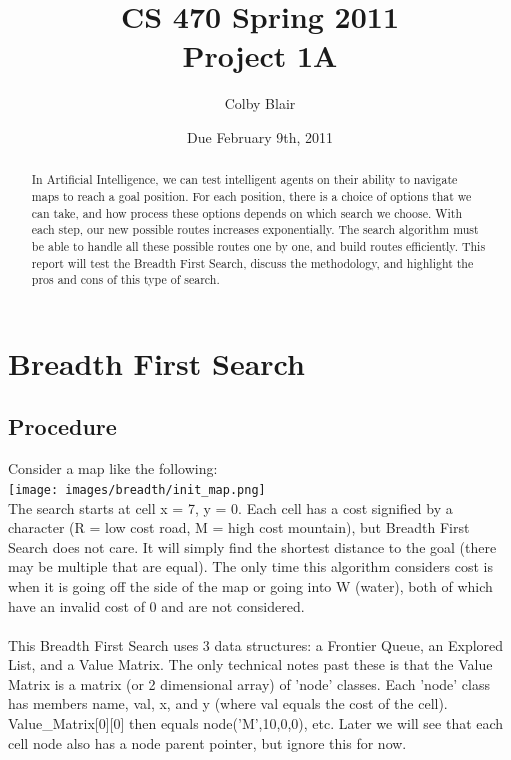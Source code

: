 \documentclass[12pt]{article}
\title{CS 470 Spring 2011 \\
     Project 1A}
\author{Colby Blair}
\date{Due February 9th, 2011}
\begin{document}
\maketitle
\begin{abstract}
In Artificial Intelligence, we can test intelligent agents on their ability to navigate maps to reach a goal position. For each position, there is a choice of options that we can take, and how process these options depends on which search we choose. With each step, our new possible routes increases exponentially. The search algorithm must be able to handle all these possible routes one by one, and build routes efficiently. This report will test the Breadth First Search, discuss the methodology, and highlight the pros and cons of this type of search.
\end{abstract}
\pagebreak
\section{Breadth First Search}
\subsection{Procedure}
Consider a map like the following:
\\
\texttt{[image: images/breadth/init\_map.png]}
\\
The search starts at cell x = 7, y = 0. Each cell has a cost signified by a character (R = low cost road, M = high cost mountain), but Breadth First Search does not care. It will simply find the shortest distance to the goal (there may be multiple that are equal). The only time this algorithm considers cost is when it is going off the side of the map or going into W (water), both of which have an invalid cost of 0 and are not considered.
\\ \\
This Breadth First Search uses 3 data structures: a Frontier Queue, an Explored List, and a Value Matrix. The only technical notes past these is that the Value Matrix is a matrix (or 2 dimensional array) of 'node' classes. Each 'node' class has members name, val, x, and y (where val equals the cost of the cell). Value\_Matrix[0][0] then equals node('M',10,0,0), etc. Later we will see that each cell node also has a node parent pointer, but ignore this for now.
 
\pagebreak
 
\end{document}
